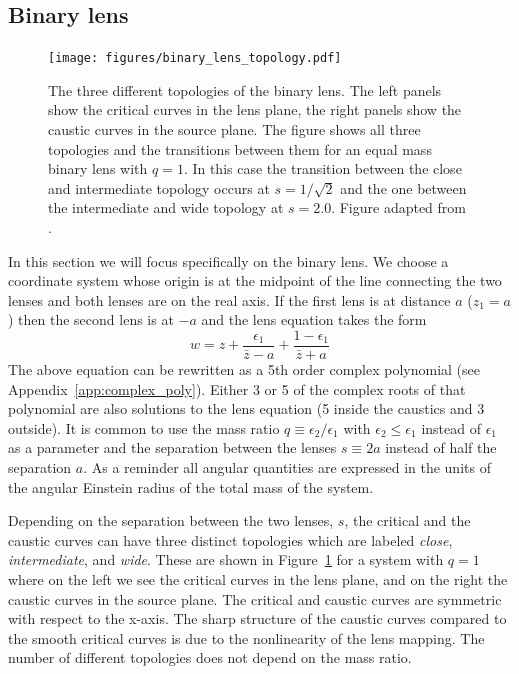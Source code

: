 \documentclass[12pt]{report}
\begin{document}
\subsection{Binary lens}
\begin{figure}[ht!]
    \centering
    \texttt{[image: figures/binary\_lens\_topology.pdf]}
    \caption{The three different topologies of the binary lens. The left panels show the
        critical curves in the lens plane, the right panels show the caustic curves in the
        source plane. The figure shows all three topologies and the transitions between
        them for an equal mass binary lens with $q=1$. In this case the transition between
        the close and intermediate topology occurs at $s=1/\sqrt{2}$ and the one between
        the intermediate and wide topology at $s=2.0$. Figure adapted from
        \citet{dominik1999}.
    }
    \label{fig:binary_lens_topology}
\end{figure}
In this section we will focus specifically on the binary lens. We choose a
coordinate system whose origin is at the midpoint of the line connecting the
two lenses and both lenses are on the real axis. If the first lens is at
distance $a$ ($z_1=a$) then the second lens is at $-a$ and the lens equation
takes the form
\begin{equation}
    w=z+\frac{\epsilon_{1}}{\bar{z} - a}+\frac{1 - \epsilon_{1}}{\bar{z} + a}
\end{equation}
The above equation can be rewritten as a 5th order complex polynomial
(see Appendix~\ref{app:complex_poly}). Either 3 or 5 of the complex roots of that
polynomial are also solutions to the lens equation
(5 inside the caustics and 3 outside).
It is common to use the mass ratio $q\equiv \epsilon_2/\epsilon_1$ with
$\epsilon_2 \leq \epsilon_1$ instead  of $\epsilon_1$ as a parameter and the
separation between the lenses $s\equiv 2a$ instead of half the separation $a$.
As a reminder all angular quantities are expressed in the units of the angular Einstein
radius of the total mass of the system.

Depending on the separation between the two lenses, $s$, the critical and the
caustic curves can have three distinct topologies which are labeled
\emph{close}, \emph{intermediate}, and \emph{wide}. These are shown in
Figure~\ref{fig:binary_lens_topology} for a system with $q=1$ where on the left
we see the critical curves in the lens plane, and on the right the caustic
curves in the source plane. The critical and caustic curves are symmetric with
respect to the x-axis. The sharp structure of the caustic curves compared to
the smooth critical curves is due to the nonlinearity of the lens mapping. The
number of different topologies does not depend on the mass ratio.
\end{document}
